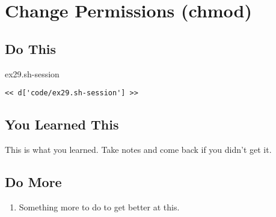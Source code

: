 \chapter{Change Permissions (chmod)}

\section{Do This}

\begin{code}{ex29.sh-session}
\begin{Verbatim}
<< d['code/ex29.sh-session'] >>
\end{Verbatim}
\end{code}


\section{You Learned This}

This is what you learned.  Take notes and come back if you didn't get it.

\section{Do More}

\begin{enumerate}
\item Something more to do to get better at this.
\end{enumerate}

